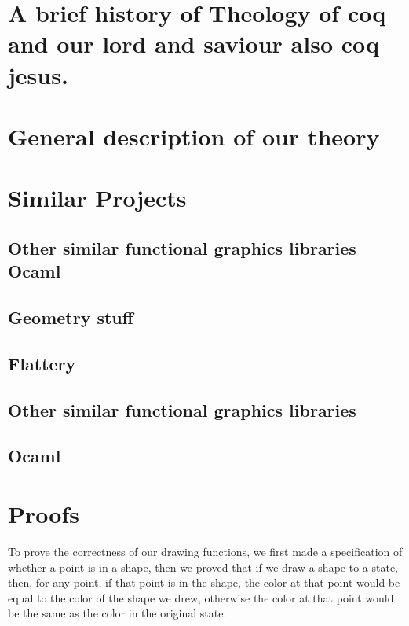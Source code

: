 \documentclass{llncs}
\begin{document}









\section{A brief history of Theology of coq and our lord and saviour also coq jesus.}

\section{General description of our theory}
\section{Similar Projects}
\subsection{Other similar functional graphics libraries Ocaml}
\subsection{Geometry stuff}

\subsection{Flattery}

\subsection{Other similar functional graphics libraries} 

\subsection{Ocaml}

\section{Proofs}
To prove the correctness of our drawing functions, we first made a specification of whether a point is in a shape, then we proved that if we draw a shape to a state, then, for any point, if that point is in the shape, the color at that point would be equal to the color of the shape we drew, otherwise the color at that point would be the same as the color in the original state.
\end{document}
